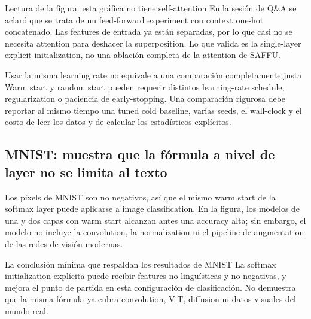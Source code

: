\begin{knowledgebox}{Lectura de la figura: esta gráfica no tiene self-attention}
En la sesión de Q\&A se aclaró que se trata de un feed-forward experiment con context one-hot concatenado. Las features de entrada ya están separadas, por lo que casi no se necesita attention para deshacer la superposition. Lo que valida es la single-layer explicit initialization, no una ablación completa de la attention de SAFFU.
\end{knowledgebox}

\begin{warningbox}{Usar la misma learning rate no equivale a una comparación completamente justa}
Warm start y random start pueden requerir distintos learning-rate schedule, regularization o paciencia de early-stopping. Una comparación rigurosa debe reportar al mismo tiempo una tuned cold baseline, varias seeds, el wall-clock y el costo de leer los datos y de calcular los estadísticos explícitos.
\end{warningbox}



\subsection{MNIST: muestra que la fórmula a nivel de layer no se limita al texto}

Los pixels de MNIST son no negativos, así que el mismo warm start de la softmax layer puede aplicarse a image classification. En la figura, los modelos de una y dos capas con warm start alcanzan antes una accuracy alta; sin embargo, el modelo no incluye la convolution, la normalization ni el pipeline de augmentation de las redes de visión modernas.


\begin{importantbox}{La conclusión mínima que respaldan los resultados de MNIST}
La softmax initialization explícita puede recibir features no lingüísticas y no negativas, y mejora el punto de partida en esta configuración de clasificación. No demuestra que la misma fórmula ya cubra convolution, ViT, diffusion ni datos visuales del mundo real.
\end{importantbox}

